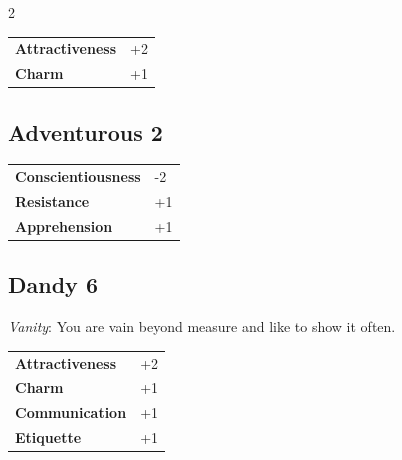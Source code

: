 \begin{multicols}{2}
\begin{tcolorbox}
\begin{tabular}{@{}ll@{}}
    \textbf{Attractiveness} & +2\\
    \textbf{Charm} & +1\\
\end{tabular}


\end{tcolorbox}

\begin{tcolorbox}
    \subsection*{Adventurous \hfill \small{2 }}
    \tcblower




\begin{tabular}{@{}ll@{}}
    \textbf{Conscientiousness} & -2\\
    \textbf{Resistance} & +1\\
    \textbf{Apprehension} & +1\\
\end{tabular}


\end{tcolorbox}

\begin{tcolorbox}
    \subsection*{Dandy \hfill \small{6 }}
    \tcblower
\textit{Vanity}: You are vain beyond measure and like to show it often.


\vspace{3mm}

\begin{tabular}{@{}ll@{}}
    \textbf{Attractiveness} & +2\\
    \textbf{Charm} & +1\\
    \textbf{Communication} & +1\\
    \textbf{Etiquette} & +1\\
\end{tabular}



\end{tcolorbox}
\end{multicols}
